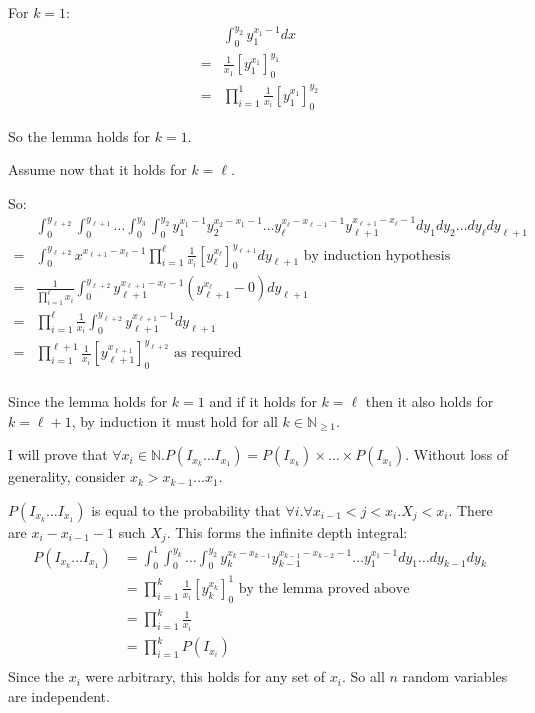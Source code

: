 \documentclass[10pt,\jkfside,a4paper]{article}
\begin{document}
\begin{enumerate}
For $k = 1$:
\[
\begin{split}
 & \int^{y_2}_0 y_1^{x_1 - 1} dx \\
=& \frac{1}{x_1}\left[ y_1^{x_1} \right]^{y_1}_0 \\
=& \prod^1_{i=1}\frac{1}{x_i}\left[ y_{1}^{x_1} \right]^{y_{2}}_0
\end{split}
\]

So the lemma holds for $k = 1$.

Assume now that it holds for $k = \ell$.

So:
\[
\begin{split}
 & \int^{y_{\ell + 2}}_0\int^{y_{\ell+1}}_0 \dots \int^{y_3}_0 \int^{y_2}_0 y_1^{x_1 - 1} y_2^{x_2 - x_1 - 1} \dots
y_\ell^{x_\ell - x_{\ell - 1} - 1} y_{\ell + 1}^{x_{\ell + 1} - x_{\ell} - 1} dy_1 dy_2 \dots dy_\ell dy_{\ell + 1} \\
=& \int^{y_{\ell + 2}}_{0}x^{x_{\ell + 1} - x_{\ell} - 1} \prod^\ell_{i=1}\frac{1}{x_i}\left[ y_{\ell}^{x_\ell}
\right]^{y_{\ell+1}}_0 dy_{\ell + 1} \text{ by induction hypothesis } \\
=& \frac{1}{\prod^\ell_{i=1}x_i} \int^{y_{\ell + 2}}_0 y_{\ell + 1}^{x_{\ell + 1} - x_\ell - 1} \left( y_{\ell +
1}^{x_\ell} - 0\right) dy_{\ell + 1} \\
=& \prod^\ell_{i=1}\frac{1}{x_i} \int^{y_{\ell + 2}}_0 y_{\ell + 1}^{x_{\ell + 1} - 1} dy_{\ell + 1} \\
=& \prod^{\ell + 1}_{i=1}\frac{1}{x_i} \left[ y_{\ell + 1}^{x_{\ell + 1}} \right]^{y_{\ell + 2}}_0 \text{ as required
 } \\
\end{split}
\]

Since the lemma holds for $k = 1$ and if it holds for $k = \ell$ then it also holds for $k = \ell + 1$, by
induction it must hold for all $k \in \mathbb{N}_{\geq 1}$.

I will prove that $\forall x_i \in \mathbb{N}. P(I_{x_k} \dots I_{x_1}) = P(I_{x_k}) \times \dots \times P
(I_{x_1})$. Without loss of generality, consider $x_k > x_{k - 1} \dots x_1$.

$P(I_{x_k} \dots I_{x_1})$ is equal to the probability that $\forall i. \forall x_{i - 1} < j < x_i. X_j < x_i$. There
are $x_i - x_{i - 1} - 1$ such $X_j$.
This forms the infinite depth integral:
\[
\begin{split}
P(I_{x_k} \dots I_{x_1}) &= \int^1_0\int^{y_{k}}_0\dots \int^{y_2}_0 y_k^{x_k - x_{k - 1}} y_{k-1}^{x_{k - 1} - x_{k
- 2} - 1} \dots y_1^{x_1 - 1} dy_1 \dots dy_{k - 1} dy_{k} \\
&= \prod^{k}_{i=1}\frac{1}{x_i} \left[ y_{k}^{x_{k}} \right]^1_0 \text{ by the lemma proved above } \\
&= \prod^{k}_{i=1}\frac{1}{x_i} \\
&= \prod^{k}_{i=1} P(I_{x_i}) \\
\end{split}
\]
Since the $x_i$ were arbitrary, this holds for any set of $x_i$. So all $n$ random
variables are independent.

\end{enumerate}
\end{document}
